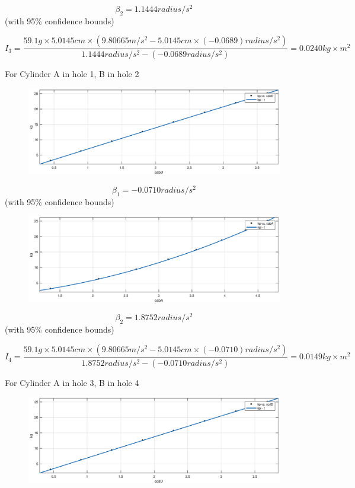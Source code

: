 $$ \beta_2 = 1.1444 radius/s^2$$ (with 95\% confidence bounds) 


$$ I_3 = \frac{59.1 g \times 5.0145 cm \times (9.80665 m/s^2 - 5.0145 cm \times (-0.0689) radius/s^2 )}{1.1444 radius/s^2 -(-0.0689 radius/s^2) } =  0.0240 kg\times m^2 $$


For Cylinder A in hole 1, B in hole 2

\begin{figure}[H]
\centering
\includegraphics[width=\EFWwr]{matlab/cabd}
\end{figure}

$$ \beta_1 = -0.0710 radius/s^2$$ (with 95\% confidence bounds) 

\begin{figure}[H]
\centering
\includegraphics[width=\EFWwr]{matlab/caba}
\end{figure}

$$ \beta_2 = 1.8752 radius/s^2$$ (with 95\% confidence bounds) 


$$ I_4 = \frac{59.1 g \times 5.0145 cm \times (9.80665 m/s^2 - 5.0145 cm \times (-0.0710) radius/s^2 )}{1.8752 radius/s^2 -(-0.0710 radius/s^2) } =  0.0149 kg\times m^2 $$


For Cylinder A in hole 3, B in hole 4

\begin{figure}[H]
\centering
\includegraphics[width=\EFWwr]{matlab/ccdd}
\end{figure}

